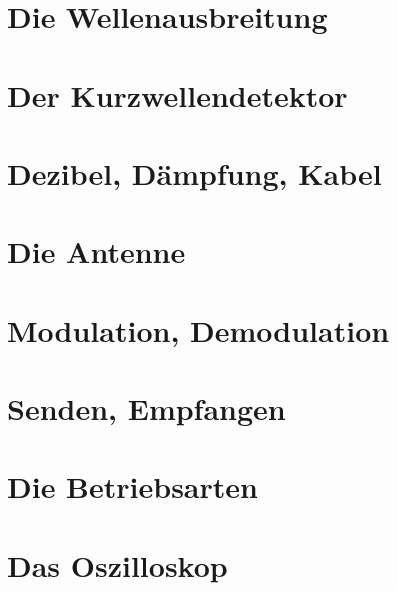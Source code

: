 \documentclass[ngerman, openany, twoside]{Script}
\begin{document}
\newpage \vspace*{5cm}
\newpage

\chapter{Die Wellenausbreitung}


\chapter{Der Kurzwellendetektor}


\chapter{Dezibel, Dämpfung, Kabel}


\newpage \vspace*{5cm}
\newpage

\chapter{Die Antenne}


\newpage \vspace*{5cm}
\newpage

\chapter{Modulation, Demodulation}


\newpage \vspace*{5cm}
\newpage

\chapter{Senden, Empfangen}


\newpage \vspace*{5cm}
\newpage

\chapter{Die Betriebsarten}


\chapter{Das Oszilloskop}

\end{document}
